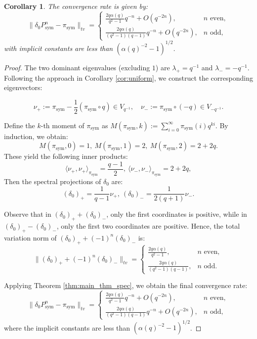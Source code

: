 \documentclass[a4]{amsart}
\newcommand{\sym}{\mathrm{sym}}
\newtheorem{corollary}[theorem]{Corollary}
\theoremstyle{remark} \newtheorem{remark}[theorem]{Remark}
\begin{document}
\begin{corollary}\label{cor:sym_converg}
The convergence rate is given by:
\[
\|\delta_0 P_\sym^n - \pi_\sym\|_{tv} = 
\begin{cases}
\frac{2q\alpha(q)}{q^2-1} q^{-n} + O(q^{-2n}), & n \text{ even}, \\
\frac{2q\alpha(q)}{(q^2-1)(q-1)} q^{-n} + O(q^{-2n}), & n \text{ odd},
\end{cases}
\]
with implicit constants are less than $(\alpha(q)^{-2} - 1)^{1/2}$.
\end{corollary}

\begin{proof}
The two dominant eigenvalues (excluding $1$) are $\lambda_+ = q^{-1}$ and $\lambda_- = -q^{-1}$. Following the approach in Corollary \ref{cor:uniform}, we construct the corresponding eigenvectors:

\[\nu_+:=\pi_\sym-\frac{1}{2}(\pi_\sym\circ q)\in V_{q^{-1}}, \quad \nu_-:=\pi_\sym\circ (-q)\in V_{-q^{-1}}.\]

Define the $k$-th moment of $\pi_\sym$ as $M(\pi_\sym, k) := \sum_{i=0}^\infty \pi_\sym(i) q^{ki}$. By induction, we obtain:
\[M(\pi_\sym, 0)=1, ~M(\pi_\sym, 1)=2, ~M(\pi_\sym, 2)=2+2q.\]
These yield the following inner products:
\[\langle\nu_+,\nu_+\rangle_{\pi_\sym}=\frac{q-1}{2},~ \langle\nu_-,\nu_-\rangle_{\pi_\sym}=2+2q,\]
Then the spectral projections of $\delta_0$ are:
\[(\delta_0)_+=\frac{1}{q-1}\nu_+, ~(\delta_0)_-=\frac{1}{2(q+1)}\nu_-.\]


Observe that in $(\delta_0)_+ + (\delta_0)_{-} $,  only the first coordinates is positive, while in $ (\delta_0)_+ - (\delta_0)_{-}$, only the first two coordinates are positive.
Hence, the total variation norm of $(\delta_0)_+ + (-1)^n (\delta_0)_-$ is:
\[
\|(\delta_0)_+ + (-1)^n (\delta_0)_-\|_{tv} = 
\begin{cases}
\frac{2q \alpha(q)}{q^2-1}, & n \text{ even}, \\
\frac{2q \alpha(q)}{(q^2-1)(q-1)}, & n \text{ odd}.
\end{cases}
\]


Applying Theorem \ref{thm:main_thm_spec}, we obtain the final convergence rate:
\[
\|\delta_0 P_\sym^n - \pi_\sym\|_{tv} = 
\begin{cases}
\frac{2q \alpha(q)}{q^2-1} q^{-n} + O(q^{-2n}), & n \text{ even}, \\
\frac{2q \alpha(q)}{(q^2-1)(q-1)} q^{-n} + O(q^{-2n}), & n \text{ odd},
\end{cases}
\]
where the implicit constants are less than $(\alpha(q)^{-2}-1)^{1/2}$.
\end{proof}
\end{document}

